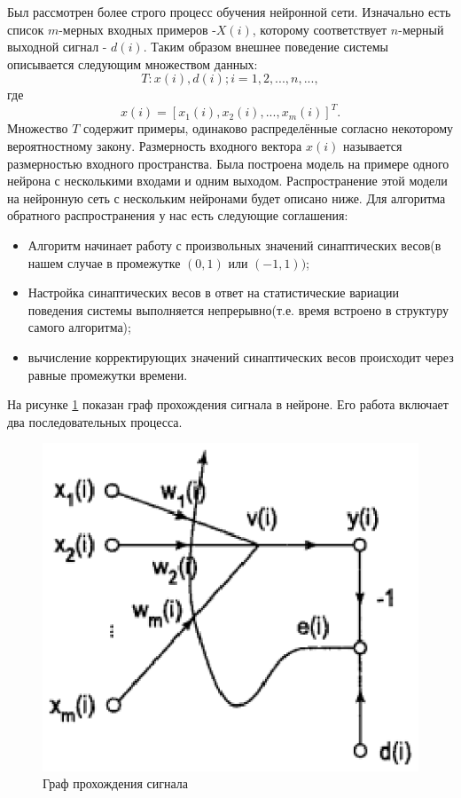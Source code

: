 \documentclass[oneside,final,14pt]{extreport}
\begin{document}
Был рассмотрен более строго процесс обучения нейронной сети.
Изначально есть список \(m\)-мерных входных примеров -\(X(i)\), которому соответствует \(n\)-мерный выходной сигнал - \(d(i)\). Таким образом внешнее поведение системы описывается следующим множеством данных:
\[T : {x(i),d(i); i = 1,2,...,n,...},\]
где 
\[x(i)=[x_1(i),x_2(i),...,x_m(i)]^T.\]
Множество \(T\) содержит примеры, одинаково распределённые согласно некоторому вероятностному закону. Размерность входного вектора \(x(i)\) называется размерностью входного пространства.
Была построена модель на примере одного нейрона с несколькими входами и одним выходом. Распространение этой модели на нейронную сеть с нескольким нейронами будет описано ниже. Для алгоритма обратного распространения у нас есть следующие соглашения:
\begin{itemize}
    \item Алгоритм начинает работу с произвольных значений синаптических весов(в нашем случае в промежутке \((0,1)\) или \((-1,1))\);
    \item Настройка синаптических весов в ответ на статистические вариации поведения системы выполняется непрерывно(т.е. время встроено в структуру самого алгоритма);
    \item вычисление корректирующих значений синаптических весов происходит через равные промежутки времени.
\end{itemize}
На рисунке \ref{fig:signal} показан граф прохождения сигнала в нейроне. Его работа включает два последовательных процесса.

\begin{figure}[t]
    \centering
    \includegraphics{signal.eps}
    \caption{Граф прохождения сигнала}
    \label{fig:signal}
\end{figure}
\end{document}
